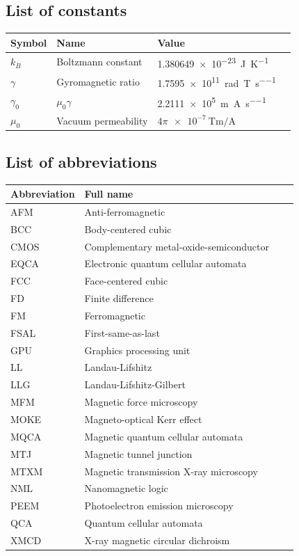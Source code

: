 \documentclass[11pt,a4paper,english,twoside]{article}
\begin{document}
\vspace*{\fill}
\cleardoublepage


\cleardoublepage
{\hypersetup{linkcolor=black}
\setcounter{tocdepth}{2}
\tableofcontents
}
\newpage
\subsection*{List of constants}
\begin{longtable}{llll}
\toprule
\bfseries Symbol & \bfseries Name &
\bfseries Value \\\midrule\endhead
$k_B$ & Boltzmann constant & \SI{1.380649e-23}{\joule\per\kelvin} \\
\midrule
$\gamma$ & Gyromagnetic ratio & \SI{1.7595e11}{\radian\per\tesla\per\second} \\
$\gamma_0$ & $\mu_0 \gamma$ & \SI{2.2111e5}{\metre\per\ampere\per\second} \\
$\mu_0$ & Vacuum permeability & $4\pi\SI{e-7}{\tesla\metre\per\ampere}$ \\
\bottomrule
\end{longtable}

\subsection*{List of abbreviations}
\begin{longtable}{llll}
\toprule
\bfseries Abbreviation & \bfseries Full name \\\midrule\endhead
AFM & Anti-ferromagnetic \\
BCC & Body-centered cubic \\
CMOS & Complementary metal-oxide-semiconductor \\
EQCA & Electronic quantum cellular automata \\
FCC & Face-centered cubic \\
FD & Finite difference \\
FM & Ferromagnetic \\
FSAL & First-same-as-last \\
GPU & Graphics processing unit \\
LL & Landau-Lifshitz \\
LLG & Landau-Lifshitz-Gilbert \\
MFM & Magnetic force microscopy \\
MOKE & Magneto-optical Kerr effect \\
MQCA & Magnetic quantum cellular automata \\
MTJ & Magnetic tunnel junction \\
MTXM & Magnetic transmission X-ray microscopy \\
NML & Nanomagnetic logic \\
PEEM & Photoelectron emission microscopy \\
QCA & Quantum cellular automata \\
XMCD & X-ray magnetic circular dichroism \\
\bottomrule
\end{longtable}
\end{document}
